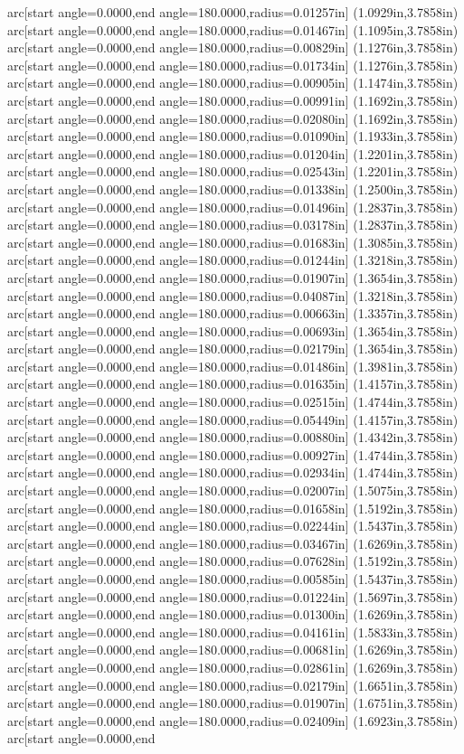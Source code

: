 arc[start angle=0.0000,end angle=180.0000,radius=0.01257in] (1.0929in,3.7858in) arc[start angle=0.0000,end angle=180.0000,radius=0.01467in] (1.1095in,3.7858in) arc[start angle=0.0000,end angle=180.0000,radius=0.00829in] (1.1276in,3.7858in) arc[start angle=0.0000,end angle=180.0000,radius=0.01734in] (1.1276in,3.7858in) arc[start angle=0.0000,end angle=180.0000,radius=0.00905in] (1.1474in,3.7858in) arc[start angle=0.0000,end angle=180.0000,radius=0.00991in] (1.1692in,3.7858in) arc[start angle=0.0000,end angle=180.0000,radius=0.02080in] (1.1692in,3.7858in) arc[start angle=0.0000,end angle=180.0000,radius=0.01090in] (1.1933in,3.7858in) arc[start angle=0.0000,end angle=180.0000,radius=0.01204in] (1.2201in,3.7858in) arc[start angle=0.0000,end angle=180.0000,radius=0.02543in] (1.2201in,3.7858in) arc[start angle=0.0000,end angle=180.0000,radius=0.01338in] (1.2500in,3.7858in) arc[start angle=0.0000,end angle=180.0000,radius=0.01496in] (1.2837in,3.7858in) arc[start angle=0.0000,end angle=180.0000,radius=0.03178in] (1.2837in,3.7858in) arc[start angle=0.0000,end angle=180.0000,radius=0.01683in] (1.3085in,3.7858in) arc[start angle=0.0000,end angle=180.0000,radius=0.01244in] (1.3218in,3.7858in) arc[start angle=0.0000,end angle=180.0000,radius=0.01907in] (1.3654in,3.7858in) arc[start angle=0.0000,end angle=180.0000,radius=0.04087in] (1.3218in,3.7858in) arc[start angle=0.0000,end angle=180.0000,radius=0.00663in] (1.3357in,3.7858in) arc[start angle=0.0000,end angle=180.0000,radius=0.00693in] (1.3654in,3.7858in) arc[start angle=0.0000,end angle=180.0000,radius=0.02179in] (1.3654in,3.7858in) arc[start angle=0.0000,end angle=180.0000,radius=0.01486in] (1.3981in,3.7858in) arc[start angle=0.0000,end angle=180.0000,radius=0.01635in] (1.4157in,3.7858in) arc[start angle=0.0000,end angle=180.0000,radius=0.02515in] (1.4744in,3.7858in) arc[start angle=0.0000,end angle=180.0000,radius=0.05449in] (1.4157in,3.7858in) arc[start angle=0.0000,end angle=180.0000,radius=0.00880in] (1.4342in,3.7858in) arc[start angle=0.0000,end angle=180.0000,radius=0.00927in] (1.4744in,3.7858in) arc[start angle=0.0000,end angle=180.0000,radius=0.02934in] (1.4744in,3.7858in) arc[start angle=0.0000,end angle=180.0000,radius=0.02007in] (1.5075in,3.7858in) arc[start angle=0.0000,end angle=180.0000,radius=0.01658in] (1.5192in,3.7858in) arc[start angle=0.0000,end angle=180.0000,radius=0.02244in] (1.5437in,3.7858in) arc[start angle=0.0000,end angle=180.0000,radius=0.03467in] (1.6269in,3.7858in) arc[start angle=0.0000,end angle=180.0000,radius=0.07628in] (1.5192in,3.7858in) arc[start angle=0.0000,end angle=180.0000,radius=0.00585in] (1.5437in,3.7858in) arc[start angle=0.0000,end angle=180.0000,radius=0.01224in] (1.5697in,3.7858in) arc[start angle=0.0000,end angle=180.0000,radius=0.01300in] (1.6269in,3.7858in) arc[start angle=0.0000,end angle=180.0000,radius=0.04161in] (1.5833in,3.7858in) arc[start angle=0.0000,end angle=180.0000,radius=0.00681in] (1.6269in,3.7858in) arc[start angle=0.0000,end angle=180.0000,radius=0.02861in] (1.6269in,3.7858in) arc[start angle=0.0000,end angle=180.0000,radius=0.02179in] (1.6651in,3.7858in) arc[start angle=0.0000,end angle=180.0000,radius=0.01907in] (1.6751in,3.7858in) arc[start angle=0.0000,end angle=180.0000,radius=0.02409in] (1.6923in,3.7858in) arc[start angle=0.0000,end 